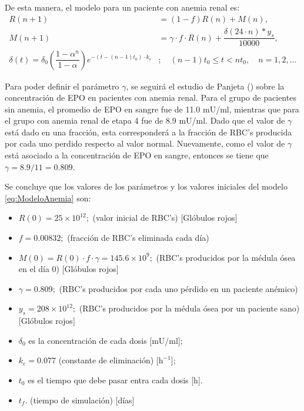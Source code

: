 De esta manera, el modelo para un paciente con anemia renal es:
\begin{align}\label{eq:ModeloAnemia}
    R(n+1) &=(1-f)R(n)+M(n), \\
    M(n+1) &=\gamma \cdot f\cdot R(n) + \dfrac{\delta(24\cdot n)*y_s}{10000}, \nonumber \\
    \delta(t) = \delta_{0} \left(\dfrac{1-\alpha^{n}}{1 - \alpha}\right) e^{-(t- (n-1) t_{0})\cdot k_e} &; \quad (n-1)t_{0} \leq t < n t_{0}, \quad n=1,2,\dots\nonumber
\end{align}

Para poder definir el parámetro $\gamma$, se seguirá el estudio de Panjeta (\cite{panjeta2017interpretation}) sobre la concentración de EPO en pacientes con anemia renal. Para el grupo de pacientes sin anemia, el promedio de EPO en sangre fue de 11.0 mU/ml, mientras que para el grupo con anemia renal de etapa 4 fue de 8.9 mU/ml. Dado que el valor de $\gamma$ está dado en una fracción, esta corresponderá a la fracción de RBC's producida por cada uno perdido respecto al valor normal. Nuevamente, como el valor de $\gamma$ está asociado a la concentración de EPO en sangre, entonces se tiene que $\gamma = 8.9/11 = 0.809$.

Se concluye que los valores de los parámetros y los valores iniciales del modelo \ref{eq:ModeloAnemia} son:

\begin{itemize}
    \item $R(0) = 25\times 10^{12};$ (valor inicial de RBC's) [Glóbulos rojos]
    \item $f=0.00832;$ (fracción de RBC's eliminada cada día)
    \item $M(0) = R(0)\cdot f \cdot \gamma = 145.6\times 10^{9};$ (RBC's producidos por la médula ósea en el día 0) [Glóbulos rojos]
    \item $\gamma = 0.809;$ (RBC's producidos por cada uno pérdido en un paciente anémico) 
    \item $y_s = 208\times 10^{12};$ (RBC's producidos por la médula ósea por un paciente sano) [Glóbulos rojos]
    \item $\delta_0$ es la concentración de cada dosis [mU/ml];
    \item $k_e=0.077$ (constante de eliminación) [$\textrm{h}^{-1}$];
    \item $t_0$ es el tiempo que debe pasar entra cada dosis [h].
    \item $t_f$. (tiempo de simulación) [días]
\end{itemize}

